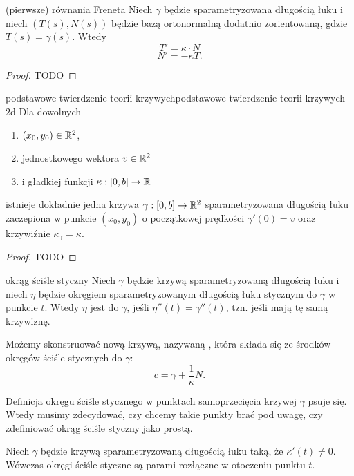 \begin{lemma}{(pierwsze) równania Freneta}{}
  Niech $\gamma$ będzie sparametryzowana długością łuku i niech $(T(s), N(s))$ będzie bazą ortonormalną dodatnio zorientowaną, gdzie $T(s)=\gamma(s)$. Wtedy
  $$T'=\kappa\cdot N$$
  $$N'=-\kappa T.$$
\end{lemma}

\begin{proof}TODO
\end{proof}

\begin{theorem}{podstawowe twierdzenie teorii krzywych}{podstawowe twierdzenie teorii krzywych 2d}
  Dla dowolnych 
  \begin{enumerate}
    \item $(x_0, y_0)\in\mathbb{R}^2$, 
    \item jednostkowego wektora $v\in \mathbb{R}^2$ 
    \item i gładkiej funkcji $\kappa:[0,b]\to\mathbb{R}$ 
  \end{enumerate}
  istnieje dokładnie jedna krzywa $\gamma:[0,b]\to\mathbb{R}^2$ sparametryzowana długością łuku zaczepiona w punkcie $(x_0, y_0)$ o początkowej prędkości $\gamma'(0)=v$ oraz krzywiźnie $\kappa_\gamma=\kappa$.
\end{theorem}

\begin{proof}TODO
\end{proof}

\begin{definition}{okrąg ściśle styczny}{}
  Niech $\gamma$ będzie krzywą sparametryzowaną długością łuku i niech $\eta$ będzie okręgiem sparametryzowanym długością łuku stycznym do $\gamma$ w punkcie $t$. Wtedy $\eta$ jest  do $\gamma$, jeśli $\eta''(t)=\gamma''(t)$, tzn. jeśli mają tę samą krzywiznę.

  Możemy skonstruować nową krzywą, nazywaną , która składa się ze środków okręgów ściśle stycznych do $\gamma$:
  $$c=\gamma+\frac{1}{\kappa}N.$$
\end{definition}

Definicja okręgu ściśle stycznego w punktach samoprzecięcia krzywej $\gamma$ psuje się. Wtedy musimy zdecydować, czy chcemy takie punkty brać pod uwagę, czy zdefiniować okrąg ściśle styczny jako prostą. 

\begin{fact}{}{}
  Niech $\gamma$ będzie krzywą sparametryzowaną długością łuku taką, że $\kappa'(t)\neq0$. Wówczas okręgi ściśle styczne są parami rozłączne w otoczeniu punktu $t$.
\end{fact}

